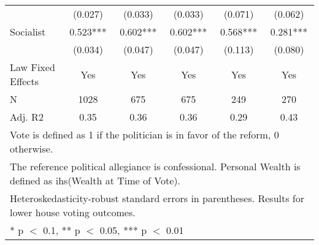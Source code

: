 \begin{table}[!h]
{\begin{tabular}[t]{lccccc}
 & (\num{0.027}) & (\num{0.033}) & (\num{0.033}) & (\num{0.071}) & (\num{0.062})\\
Socialist & \num{0.523}*** & \num{0.602}*** & \num{0.602}*** & \num{0.568}*** & \num{0.281}***\\
 & (\num{0.034}) & (\num{0.047}) & (\num{0.047}) & (\num{0.113}) & (\num{0.080})\\
\midrule
Law Fixed Effects & Yes & Yes & Yes & Yes & Yes\\
N & \num{1028} & \num{675} & \num{675} & \num{249} & \num{270}\\
Adj. R2 & \num{0.35} & \num{0.36} & \num{0.36} & \num{0.29} & \num{0.43}\\
\bottomrule
\multicolumn{6}{l}{\rule{0pt}{1em}Vote is defined as 1 if the politician is in favor of the reform, 0 otherwise.}\\
\multicolumn{6}{l}{\rule{0pt}{1em}The reference political allegiance is confessional. Personal Wealth is defined as ihs(Wealth at Time of Vote).}\\
\multicolumn{6}{l}{\rule{0pt}{1em}Heteroskedasticity-robust standard errors in parentheses. Results for lower house voting outcomes.}\\
\multicolumn{6}{l}{\rule{0pt}{1em}* p $<$ 0.1, ** p $<$ 0.05, *** p $<$ 0.01}\\
\end{tabular}}
\end{table}
